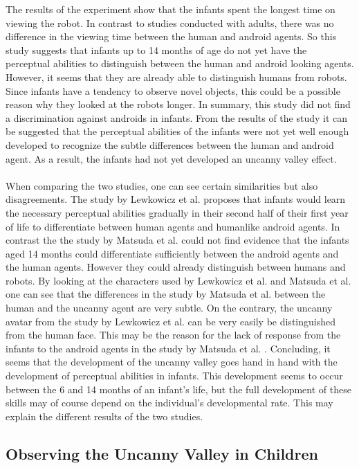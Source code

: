 The results of the experiment show that the infants spent the longest time on viewing the robot. In contrast to studies conducted with adults, there was no difference in the viewing time between the human and android agents. So this study suggests that infants up to 14 months of age do not yet have the perceptual abilities to distinguish between the human and android looking agents. However, it seems that they are already able to distinguish humans from robots. Since infants have a tendency to observe novel objects, this could be a possible reason why they looked at the robots longer. In summary, this study did not find a discrimination against androids in infants. From the results of the study it can be suggested that the perceptual abilities of the infants were not yet well enough developed to recognize the subtle differences between the human and android agent. As a result, the infants had not yet developed an uncanny valley effect.\\\\
When comparing the two studies, one can see certain similarities but also disagreements. The study by Lewkowicz et al. \cite{uncanny_infants} proposes that infants would learn the necessary perceptual abilities gradually in their second half of their first year of life to differentiate between human agents and humanlike android agents. In contrast the the study by Matsuda et al. \cite{uncanny_infant_discrimination} could not find evidence that the infants aged 14 months could differentiate sufficiently between the android agents and the human agents. However they could already distinguish between humans and robots. By looking at the characters used by Lewkowicz et al. and Matsuda et al. one can see that the differences in the study by Matsuda et al. between the human and the uncanny agent are very subtle. On the contrary, the uncanny avatar from the study by Lewkowicz et al.  can be very easily be distinguished from the human face. This may be the reason for the lack of response from the infants to the android agents in the study by Matsuda et al. . Concluding, it seems that the development of the uncanny valley goes hand in hand with the development of perceptual abilities in infants. This development seems to occur between the 6 and 14 months of an infant's life, but the full development of these skills  may of course depend on the individual's developmental rate. This may explain the different results of the two studies. 
\newpage

\subsection{Observing the Uncanny Valley in Children}





